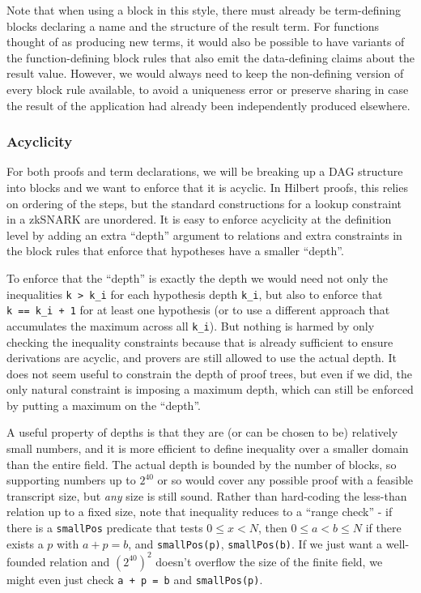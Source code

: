 \documentclass{article}
\theoremstyle{plain}
\theoremstyle{definition}
\begin{document}
Note that when using a block in this style, there must already be
term-defining blocks declaring a name and the structure of the result term.
For functions thought of as producing new terms, it would also be possible
to have variants of the function-defining block rules that also emit the
data-defining claims about the result value.
However, we would always need to keep the non-defining version of
every block rule available, to avoid a uniqueness error or preserve
sharing in case the result of the application had already been
independently produced elsewhere.

\subsubsection{Acyclicity}\label{acyclicity}

For both proofs and term declarations, we will be breaking up a DAG
structure into blocks and we want to enforce that it is acyclic. In Hilbert
proofs, this relies on ordering of the steps, but the standard
constructions for a lookup constraint in a zkSNARK are unordered.
It is easy to enforce acyclicity at the definition level by adding
an extra ``depth'' argument to relations and extra constraints in
the block rules that enforce that hypotheses have a smaller ``depth''.

To enforce that the ``depth'' is exactly the depth we would need not
only the inequalities \texttt{k\ \textgreater{}\ k\_i} for each
hypothesis depth \texttt{k\_i}, but also to enforce that
\texttt{k\ ==\ k\_i\ +\ 1} for at least one hypothesis (or to use a
different approach that accumulates the maximum across all \texttt{k\_i}).
But nothing is harmed by only checking the inequality constraints
because that is already sufficient to ensure derivations are acyclic,
and provers are still allowed to use the actual depth.
It does not seem useful to constrain the depth of proof trees, but
even if we did, the only natural constraint is imposing a maximum depth,
which can still be enforced by putting a maximum on the ``depth''.

A useful property of depths is that they are (or can be chosen to be)
relatively small numbers, and it is
more efficient to define inequality over a smaller domain than the
entire field. The actual depth is bounded by the number of blocks, so
supporting numbers up to $2^{40}$ or so would cover any possible
proof with a feasible transcript size, but \emph{any} size is still
sound. Rather than hard-coding the less-than relation up to a fixed size,
note that inequality reduces to a ``range check'' -
if there is a \texttt{smallPos} predicate that tests
$0 \le x < N$, then $0 \le a < b \le N$ if there
exists a $p$ with $a + p = b$, and
\texttt{smallPos(p)}, \texttt{smallPos(b)}.
If we just want a
well-founded relation and $(2^{40})^2$ doesn't overflow the size
of the finite field, we might even just check \texttt{a\ +\ p\ =\ b} and \texttt{smallPos(p)}.
\end{document}
